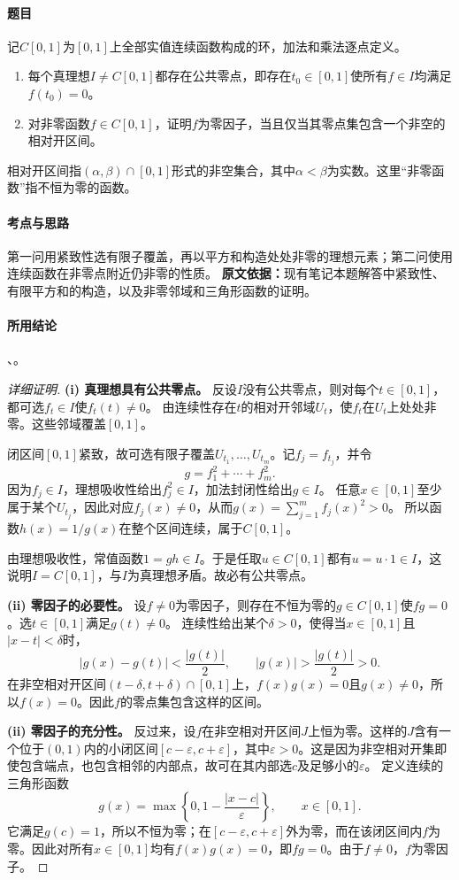 \paragraph{题目}
记$C[0,1]$为$[0,1]$上全部实值连续函数构成的环，加法和乘法逐点定义。
\begin{enumerate}
\item 每个真理想$I\ne C[0,1]$都存在公共零点，即存在$t_0\in[0,1]$使所有$f\in I$均满足$f(t_0)=0$。
\item 对非零函数$f\in C[0,1]$，证明$f$为零因子，当且仅当其零点集包含一个非空的相对开区间。
\end{enumerate}
相对开区间指$(\alpha,\beta)\cap[0,1]$形式的非空集合，其中$\alpha<\beta$为实数。这里“非零函数”指不恒为零的函数。
\paragraph{考点与思路}
第一问用紧致性选有限子覆盖，再以平方和构造处处非零的理想元素；第二问使用连续函数在非零点附近仍非零的性质。
\textbf{原文依据：}现有笔记本题解答中紧致性、有限平方和的构造，以及非零邻域和三角形函数的证明。
\paragraph{所用结论}
、。
\begin{proof}[详细证明]
\textbf{(i) 真理想具有公共零点。}
反设$I$没有公共零点，则对每个$t\in[0,1]$，都可选$f_t\in I$使$f_t(t)\ne0$。
由连续性存在$t$的相对开邻域$U_t$，使$f_t$在$U_t$上处处非零。这些邻域覆盖$[0,1]$。

闭区间$[0,1]$紧致，故可选有限子覆盖$U_{t_1},\ldots,U_{t_m}$。记$f_j=f_{t_j}$，并令
\[
g=f_1^2+\cdots+f_m^2.
\]
因为$f_j\in I$，理想吸收性给出$f_j^2\in I$，加法封闭性给出$g\in I$。
任意$x\in[0,1]$至少属于某个$U_{t_j}$，因此对应$f_j(x)\ne0$，从而$g(x)=\sum_{j=1}^m f_j(x)^2>0$。
所以函数$h(x)=1/g(x)$在整个区间连续，属于$C[0,1]$。

由理想吸收性，常值函数$1=gh\in I$。于是任取$u\in C[0,1]$都有$u=u\cdot1\in I$，这说明$I=C[0,1]$，与$I$为真理想矛盾。故必有公共零点。

\textbf{(ii) 零因子的必要性。}
设$f\ne0$为零因子，则存在不恒为零的$g\in C[0,1]$使$fg=0$。选$t\in[0,1]$满足$g(t)\ne0$。
连续性给出某个$\delta>0$，使得当$x\in[0,1]$且$|x-t|<\delta$时，
\[
|g(x)-g(t)|<\frac{|g(t)|}{2},\qquad
|g(x)|>\frac{|g(t)|}{2}>0.
\]
在非空相对开区间$(t-\delta,t+\delta)\cap[0,1]$上，$f(x)g(x)=0$且$g(x)\ne0$，所以$f(x)=0$。因此$f$的零点集包含这样的区间。

\textbf{(ii) 零因子的充分性。}
反过来，设$f$在非空相对开区间$J$上恒为零。这样的$J$含有一个位于$(0,1)$内的小闭区间$[c-\varepsilon,c+\varepsilon]$，其中$\varepsilon>0$。这是因为非空相对开集即使包含端点，也包含相邻的内部点，故可在其内部选$c$及足够小的$\varepsilon$。
定义连续的三角形函数
\[
g(x)=\max\left\{0,1-\frac{|x-c|}{\varepsilon}\right\},\qquad x\in[0,1].
\]
它满足$g(c)=1$，所以不恒为零；在$[c-\varepsilon,c+\varepsilon]$外为零，而在该闭区间内$f$为零。因此对所有$x\in[0,1]$均有$f(x)g(x)=0$，即$fg=0$。由于$f\ne0$，$f$为零因子。
\end{proof}

